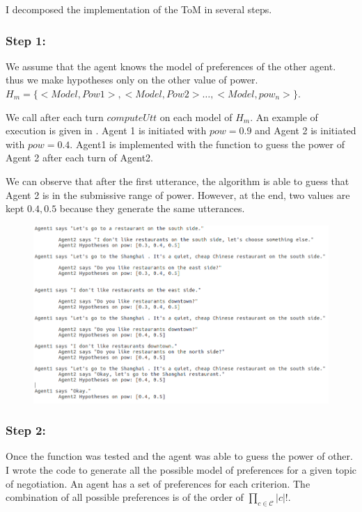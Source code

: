 \documentclass{llncs}
\begin{document}
I decomposed the implementation of the ToM in several steps. 

	\subsubsection{Step 1:} We assume that the agent knows the model of preferences of the other agent. thus we make hypotheses only on the other value of power. 
	$H_m= \{<Model, Pow1>, <Model, Pow2>\ldots, <Model, pow_n> \}$.

	We call after each turn $computeUtt$ on each model of $H_m$. An example of execution is given in . Agent 1 is initiated with $pow =0.9$ and Agent 2 is initiated with $pow =0.4$. Agent1 is implemented with the function to guess the power of Agent 2 after each turn of Agent2.

	We can observe that after the first utterance, the algorithm is able to guess that Agent 2 is in the submissive range of power. However, at the end, two values are kept $0.4,0.5$ because they generate the same utterances.
	
	 \begin{figure} [h]
	 	\centerline{\includegraphics[width=5in]{figs/ex.png}}
	 	\vskip 8pt
	 \end{figure}
	 
	
	\subsubsection{Step 2:} Once the function was tested and the agent was able to guess the power of other. I wrote the code to generate all the possible model of preferences for a given topic of negotiation. An agent has a set of preferences for each criterion. The combination of all possible preferences is of the order of $\prod_{c\in\mathcal{C}} |c|!$. 
	
\end{document}
